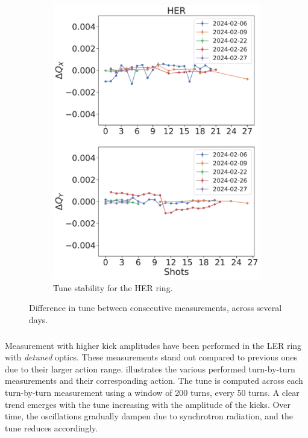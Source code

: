 \begin{figure}[!htb]
\begin{subfigure}[b]{0.48\textwidth}
        \includegraphics[width=\linewidth]{images/kek/SUPERKEKBHER_shots.pdf}
        \caption{Tune stability for the HER ring.}
    \end{subfigure}
    \caption{Difference in tune between consecutive measurements, across several days.}
    \label{fig:kek:shots}
\end{figure}


\FloatBarrier
\subsubsection{}

Measurement with higher kick amplitudes have been performed in the LER ring with \textit{detuned}
optics. These measurements stand out compared to previous ones due to their larger action range.
 illustrates the various performed turn-by-turn measurements and
their corresponding action.
The tune is computed across each turn-by-turn measurement using a window of 200 turns, every 50
turns. A clear trend emerges with the tune increasing with the amplitude of the kicks. Over time,
the oscillations gradually dampen due to synchrotron radiation, and the tune reduces accordingly.

